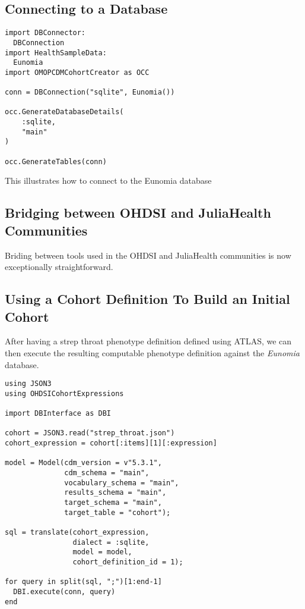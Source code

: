 \documentclass{juliacon}
\begin{document}
\subsection{Connecting to a Database}

\begin{listing}[!ht]
\begin{verbatim}
import DBConnector: 
  DBConnection
import HealthSampleData: 
  Eunomia
import OMOPCDMCohortCreator as OCC

conn = DBConnection("sqlite", Eunomia())

occ.GenerateDatabaseDetails(
    :sqlite,
    "main"
)

occ.GenerateTables(conn)
\end{verbatim}
\caption{This illustrates how to connect to the Eunomia database}
\label{listing:connection}
\end{listing}


\subsection{Bridging between OHDSI and JuliaHealth Communities}

Briding between tools used in the OHDSI and JuliaHealth communities is now exceptionally straightforward.


\subsection{Using a Cohort Definition To Build an Initial Cohort}

After having a strep throat phenotype definition defined using ATLAS, we can then execute the resulting computable phenotype definition against the \textit{Eunomia} database.

\begin{verbatim}
using JSON3 
using OHDSICohortExpressions

import DBInterface as DBI

cohort = JSON3.read("strep_throat.json")
cohort_expression = cohort[:items][1][:expression]

model = Model(cdm_version = v"5.3.1", 
              cdm_schema = "main",
              vocabulary_schema = "main", 
              results_schema = "main",
              target_schema = "main", 
              target_table = "cohort");

sql = translate(cohort_expression, 
                dialect = :sqlite, 
                model = model, 
                cohort_definition_id = 1);

for query in split(sql, ";")[1:end-1]
  DBI.execute(conn, query)
end
\end{verbatim}
\end{document}
